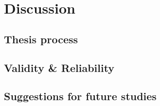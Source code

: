 \chapter{Discussion}

\section{Thesis process}

\section{Validity & Reliability}

\section{Suggestions for future studies}
